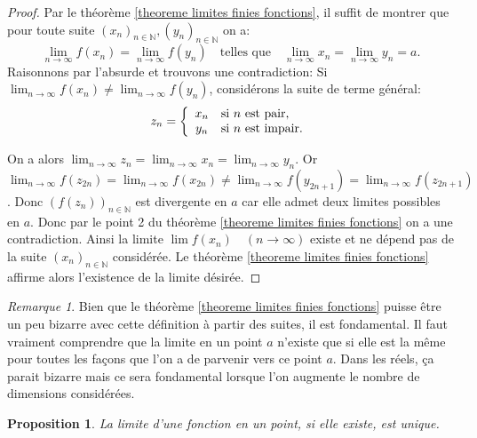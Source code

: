 \documentclass[oneside,12pt,french,table]{book}
\theoremstyle{definition}
\theoremstyle{plain}
\newtheorem{proposition}[definition]{Proposition}
\theoremstyle{remark}
\newtheorem{remark}[definition]{Remarque}
\newcommand{\Nn}{{\mathbb{N}}}
\begin{document}
\begin{proof}
    

Par le théorème \ref{theoreme limites finies fonctions}, il suffit de montrer que pour toute suite $(x_n)_{n\in\Nn}, (y_n)_{n\in\Nn}$ on a:
\[
\lim_{n\rightarrow\infty}f(x_n)=\lim_{n\rightarrow\infty}f(y_n) \quad \text{telles que}\quad \lim_{n\rightarrow \infty}x_n=\lim_{n\rightarrow \infty}y_n=a.
\]
Raisonnons par l'absurde et trouvons une contradiction: Si $\lim_{n\rightarrow\infty}f(x_n)\neq\lim_{n\rightarrow\infty}f(y_n)$, considérons la suite de terme général:
\[z_n=
     \left \{
   \begin{array}{c l}
      x_n & \text{si $n$ est pair,}\\
      y_n &\text{si $n$ est impair}. 
   \end{array}
   \right .\]

On a alors $\lim_{n\rightarrow\infty}z_n=\lim_{n\rightarrow\infty}x_n=\lim_{n\rightarrow\infty}y_n$. Or $\lim_{n\rightarrow\infty}f(z_{2n})=\lim_{n\rightarrow\infty}f(x_{2n})\neq\lim_{n\rightarrow\infty}f(y_{2n+1})=\lim_{n\rightarrow\infty}f(z_{2n+1})$. Donc $(f(z_n))_{n\in\Nn}$ est divergente en $a$ car elle admet deux limites possibles en $a$. Donc par le point 2 du théorème \ref{theoreme limites finies fonctions} on a une contradiction. Ainsi la limite $\lim f(x_n)\quad(n\rightarrow\infty)$ existe et ne dépend pas de la suite $(x_n)_{n\in\Nn}$ considérée. Le théorème \ref{theoreme limites finies fonctions} affirme alors l'existence de la limite désirée.
\end{proof}
 \begin{remark}
     Bien que le théorème \ref{theoreme limites finies fonctions} puisse être un peu bizarre avec cette définition à partir des suites, il est fondamental.  Il faut vraiment comprendre que la limite en un point $a$ n'existe que si elle est la même pour toutes les façons que l'on a de parvenir vers ce point $a$. Dans les réels, ça parait bizarre mais ce sera fondamental lorsque l'on augmente le nombre de dimensions considérées.
 \end{remark}
\begin{proposition}
    La limite d'une fonction en un point, si elle existe, est unique.
\end{proposition}
\end{document}
